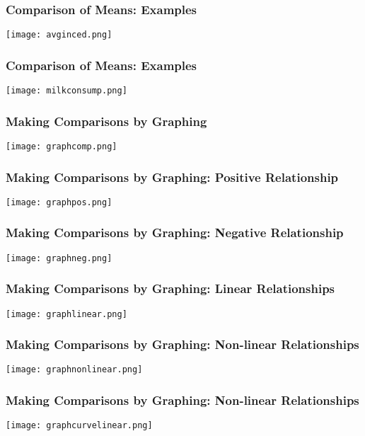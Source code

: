 \documentclass{beamer}
\begin{document}
\begin{frame}
 \frametitle{Comparison of Means: Examples}
 \texttt{[image: avginced.png]}
\end{frame}

\begin{frame}
 \frametitle{Comparison of Means: Examples}
 \texttt{[image: milkconsump.png]}
\end{frame}

\begin{frame}
 \frametitle{Making Comparisons by Graphing}
 \begin{center}
 \texttt{[image: graphcomp.png]} 
 \end{center}
\end{frame}


\begin{frame}
 \frametitle{Making Comparisons by Graphing: Positive Relationship}
 \begin{center}
 \texttt{[image: graphpos.png]}
 \end{center}
\end{frame}

\begin{frame}
 \frametitle{Making Comparisons by Graphing: Negative Relationship}
 \begin{center}
 \texttt{[image: graphneg.png]}
 \end{center}
\end{frame}

\begin{frame}
 \frametitle{Making Comparisons by Graphing: Linear Relationships}
 \begin{center}
 \texttt{[image: graphlinear.png]}
 \end{center}
\end{frame}

\begin{frame}
 \frametitle{Making Comparisons by Graphing: Non-linear Relationships}
 \begin{center}
 \texttt{[image: graphnonlinear.png]}
 \end{center}
\end{frame}

\begin{frame}
 \frametitle{Making Comparisons by Graphing: Non-linear Relationships}
 \begin{center}
 \texttt{[image: graphcurvelinear.png]}
 \end{center}
\end{frame}
\end{document}
